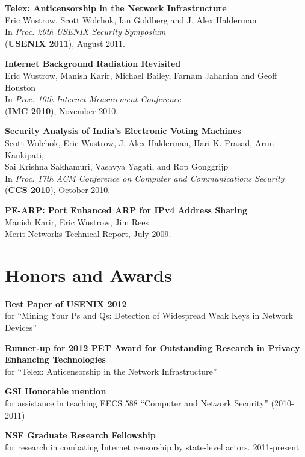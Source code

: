 \documentclass{res}
\begin{document}
\begin{resume}
    \textbf{Telex: Anticensorship in the Network Infrastructure} \\
    Eric Wustrow, Scott Wolchok, Ian Goldberg and J. Alex Halderman \\
    In \emph{Proc. 20th USENIX Security Symposium} \\
    (\textbf{USENIX 2011}), August 2011.

	\textbf{Internet Background Radiation Revisited} \\
	Eric Wustrow, Manish Karir, Michael Bailey, Farnam Jahanian and Geoff Houston \\
	In \emph{Proc. 10th Internet Measurement Conference} \\
	(\textbf{IMC 2010}), November 2010.

	\textbf{Security Analysis of India's Electronic Voting  Machines} \\ 
	Scott Wolchok, Eric Wustrow, J. Alex Halderman, Hari K. Prasad, Arun Kankipati, \\
	Sai Krishna Sakhamuri, Vasavya Yagati, and Rop Gonggrijp \\
	In \emph{Proc. 17th ACM Conference on Computer and Communications 
	Security} \\
	(\textbf{CCS 2010}), October 2010.

	\textbf{PE-ARP: Port Enhanced ARP for IPv4 Address Sharing} \\
	Manish Karir, Eric Wustrow, Jim Rees \\
	Merit Networks Technical Report, July 2009.	

\section{Honors and Awards}

    \textbf{Best Paper of USENIX 2012} \\
    for ``Mining Your Ps and Qs: Detection of Widespread Weak Keys in Network Devices''

    \textbf{Runner-up for 2012 PET Award for Outstanding Research in Privacy Enhancing Technologies} \\
    for ``Telex: Anticensorship in the Network Infrastructure''

    \textbf{GSI Honorable mention} \\
    for assistance in teaching EECS 588 ``Computer and Network Security'' (2010-2011)

    \textbf{NSF Graduate Research Fellowship} \\
    for research in combating Internet censorship by state-level actors. 2011-present


\end{resume}
\end{document}
